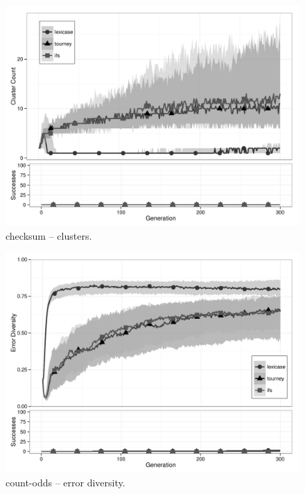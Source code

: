 \begin{figure}[p] %
\centering
\includegraphics[width=11.5cm]{checksum-cluster.pdf}
\caption{checksum -- clusters.}
\label{checksumClu}
\end{figure}

\begin{figure}[p] %
\centering
\includegraphics[width=11.5cm]{count-odds-diversity.pdf}
\caption{count-odds -- error diversity.}
\label{count-oddsDiv}
\end{figure}

